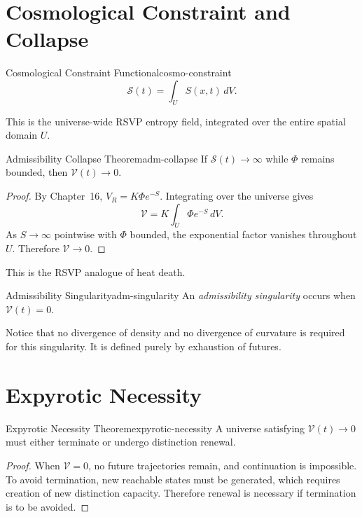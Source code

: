 \documentclass[12pt,twoside,openright]{book}
\begin{document}
\section{Cosmological Constraint and Collapse}
\label{sec:ch18-collapse}

\begin{definition}{Cosmological Constraint Functional}{cosmo-constraint}
  \[
    \mathcal{S}(t) = \int_U S(x,t)\, dV.
  \]
\end{definition}

This is the universe-wide RSVP entropy field, integrated
over the entire spatial domain $U$.

\begin{theorem}{Admissibility Collapse Theorem}{adm-collapse}
  If $\mathcal{S}(t) \to \infty$ while $\Phi$ remains
  bounded, then $\mathcal{V}(t) \to
  0$.
\end{theorem}

\begin{proof}
  By Chapter~16, $V_R = K\Phi e^{-S}$. Integrating over the
  universe gives
  \[
    \mathcal{V} = K \int_U \Phi e^{-S} \, dV.
  \]
  As $S \to \infty$ pointwise with $\Phi$ bounded, the
  exponential factor vanishes throughout $U$. Therefore
  $\mathcal{V} \to 0$.
\end{proof}

This is the RSVP analogue of heat death.

\begin{definition}{Admissibility Singularity}{adm-singularity}
  An \emph{admissibility singularity} occurs when
  $\mathcal{V}(t) = 0$.
\end{definition}

Notice that no divergence of density and no divergence of
curvature is required for this singularity. It is defined
purely by exhaustion of futures.

\section{Expyrotic Necessity}
\label{sec:ch18-necessity}

\begin{theorem}{Expyrotic Necessity Theorem}{expyrotic-necessity}
  A universe satisfying $\mathcal{V}(t) \to 0$ must either
  terminate or undergo distinction renewal.
\end{theorem}

\begin{proof}
  When $\mathcal{V} = 0$, no future trajectories remain, and
  continuation is impossible. To avoid termination, new
  reachable states must be generated, which requires
  creation of new distinction capacity. Therefore renewal
  is necessary if termination is to be avoided.
\end{proof}
\end{document}
